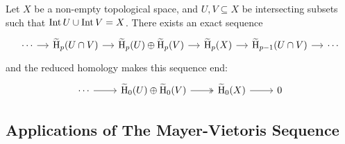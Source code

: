 \begin{corollary}
\label{cor:mayer-vietoris-for-reduced-homology}
Let \(X\) be a non-empty topological space, and \(U, V \subseteq X\) be intersecting
subsets such that \(\operatorname{Int} U \cup \operatorname{Int} V = X\). There exists an exact sequence
\[
\begin{tikzcd}[column sep=small]
\cdots \ar[r]
&\rHmlg_p(U \cap V) \ar[r]
&\rHmlg_p(U) \oplus \rHmlg_p(V) \ar[r]
&\rHmlg_p(X) \ar[r]
&\rHmlg_{p-1}(U \cap V) \ar[r]
&\cdots
\end{tikzcd}
\]
and the reduced homology makes this sequence end:
\[
\begin{tikzcd}
\cdots \ar[r]
&\rHmlg_0(U) \oplus \rHmlg_0(V) \ar[r, two heads]
&\rHmlg_0(X) \ar[r]
&0
\end{tikzcd}
\]
\end{corollary}

\subsection{Applications of The Mayer-Vietoris Sequence}

